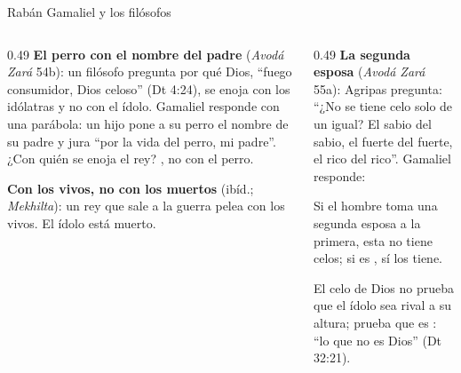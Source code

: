 \begin{frame}{Rabán Gamaliel y los filósofos}
\begin{columns}[t,onlytextwidth]
\begin{column}{0.49\textwidth}\scriptsize
\textbf{El perro con el nombre del padre} (\emph{Avodá Zará} 54b): un filósofo pregunta por qué Dios, ``fuego consumidor, Dios celoso'' (Dt 4:24), se enoja con los idólatras y no con el ídolo. Gamaliel responde con una parábola: un hijo pone a su perro el nombre de su padre y jura ``por la vida del perro, mi padre''. ¿Con quién se enoja el rey? , no con el perro.\par\smallskip
\textbf{Con los vivos, no con los muertos} (ibíd.; \emph{Mekhilta}): un rey que sale a la guerra pelea con los vivos. El ídolo está muerto.
\end{column}
\begin{column}{0.49\textwidth}\scriptsize
\textbf{La segunda esposa} (\emph{Avodá Zará} 55a): Agripas pregunta: ``¿No se tiene celo solo de un igual? El sabio del sabio, el fuerte del fuerte, el rico del rico''. Gamaliel responde:
\begin{center}\end{center}
Si el hombre toma una segunda esposa  a la primera, esta no tiene celos; si es , sí los tiene.\par\smallskip
El celo de Dios no prueba que el ídolo sea rival a su altura; prueba que es : ``lo que no es Dios'' (Dt 32:21).
\end{column}
\end{columns}\par\smallskip
{}
\end{frame}

